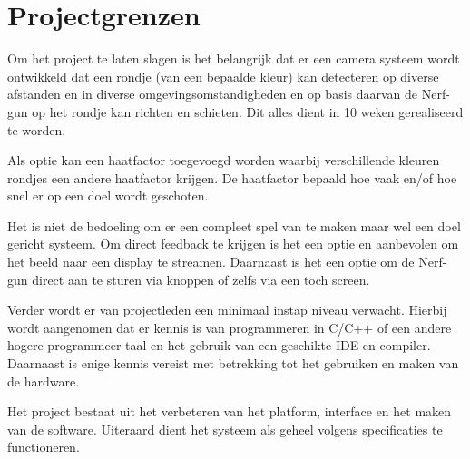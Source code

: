 \chapter{Projectgrenzen}

Om het project te laten slagen is het belangrijk dat er een camera systeem
wordt ontwikkeld dat een rondje (van een bepaalde kleur) kan detecteren op
diverse afstanden en in diverse omgevingsomstandigheden en op basis daarvan de
Nerf-gun op het rondje kan richten en schieten. Dit alles dient in 10 weken
gerealiseerd te worden.

Als optie kan een haatfactor toegevoegd worden waarbij verschillende kleuren
rondjes een andere haatfactor krijgen. De haatfactor bepaald hoe vaak en/of hoe
snel er op een doel wordt geschoten.

Het is niet de bedoeling om er een compleet spel van te maken maar wel een doel
gericht systeem. Om direct feedback te krijgen is het een optie en aanbevolen
om het beeld naar een display te streamen. Daarnaast is het een optie om de
Nerf-gun direct aan te sturen via knoppen of zelfs via een toch screen.

Verder wordt er van projectleden een minimaal instap niveau verwacht. Hierbij
wordt aangenomen dat er kennis is van programmeren in C/C++ of een andere
hogere programmeer taal en het gebruik van een geschikte IDE en compiler.
Daarnaast is enige kennis vereist met betrekking tot het gebruiken en maken van
de hardware.

Het project bestaat uit het verbeteren van het platform, interface en het maken
van de software. Uiteraard dient het systeem als geheel volgens specificaties
te functioneren.
